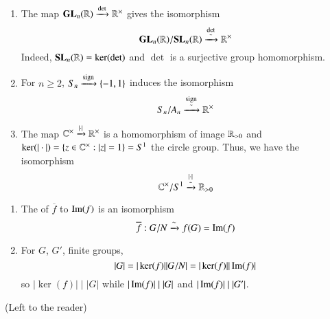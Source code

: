 \documentclass[12pt, a4paper, twoside, openright, titlepage]{book}
\begin{document}
\begin{eg}{}{}
        \leavevmode
        \begin{enumerate}
                \item The map $\mathbf{GL}_n(\mathbb R)\xrightarrow{\det}\mathbb R^{\times}$ gives the isomorphism \begin{equation}
                                \mathbf{GL}_n(\mathbb R)/\mathbf{SL}_n(\mathbb R)\xrightarrow{\underset{\sim}{\det}}\mathbb R^{\times}
                \end{equation}
                        Indeed, $\mathbf{SL}_n(\mathbb R) = \ker(\det)$ and $\det$ is a surjective group homomorphism.
                \item For $n\geq 2$, $S_n\xrightarrow{\operatorname{sign}}\{-1,1\}$ induces the isomorphism \begin{equation}
                                S_n/A_n \xrightarrow{\underset{\sim}{\operatorname{sign}}}\mathbb R^{\times}
                \end{equation}
                \item The map $\mathbb C^{\times} \xrightarrow{|\cdot|}\mathbb R^{\times}$ is a homomorphism of image $\mathbb R_{>0}$ and $\ker(|\cdot |) = \{z \in \mathbb C^{\times}:|z| = 1\} = S^1$ the circle group. Thus, we have the isomorphism \begin{equation}
                                \mathbb C^{\times}/S^1 \xrightarrow{\underset{\sim}{|\cdot|}}\mathbb R_{>0}
                \end{equation}
        \end{enumerate}
\end{eg}


\begin{cor}{}{}
        \leavevmode
        \begin{enumerate}
                \item The  of $\overline{f}$ to $\operatorname{Im}(f)$ is an isomorphism \begin{equation}
                                \overline{f}:G/N\xrightarrow{\sim}f(G) = \operatorname{Im}(f)
                \end{equation}
                \item For $G$, $G'$, finite groups, \begin{equation}
                                |G| = |\ker(f)||G/N| = |\ker(f)||\operatorname{Im}(f)|
                \end{equation}
                        so $|\ker(f)|\;\vert\;|G|$ while $|\operatorname{Im}(f)|\;\vert\;|G|$ and $|\operatorname{Im}(f)|\;\vert\;|G'|$.
        \end{enumerate}
\end{cor}
\begin{proof*}{}{}
        (Left to the reader)
\end{proof*}
\end{document}
